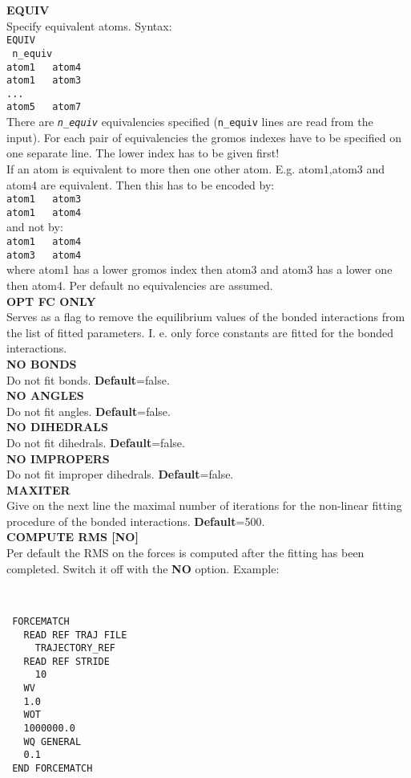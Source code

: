 \documentclass[twoside,10pt,titlepage,a4paper]{article}
\newcommand{\desc}[1]{%
   \hspace*{\fill} \parbox{130mm}{\sloppy
                          {#1}%
                             }
     \hfill\\\smallskip
   }%
\newcommand{\desc}[1]{#1\vspace{1ex}}
\begin{document}
\desc{
\textbf{EQUIV} \\
Specify equivalent atoms. Syntax: \\

\texttt{EQUIV} \\
\texttt{  n\_equiv \\
atom1 \ \ atom4 \\
atom1 \ \  atom3 \\
... \\
atom5 \ \ atom7} \\

There are \texttt{\textit{n\_equiv}} equivalencies specified (\texttt{n\_equiv} lines are read from the input). For each pair of equivalencies the gromos indexes have to be specified on one separate line. The lower index has to be given first!\\
If an atom is equivalent to more then one other atom. E.g. atom1,atom3 and atom4 are equivalent. Then this has to be encoded by: \\

\texttt{atom1 \ \ atom3 \\
atom1 \ \  atom4} \\

and not by: \\

\texttt{atom1 \ \ atom4 \\
atom3 \ \ atom4 }  \\

where atom1 has a lower gromos index then atom3 and atom3 has a lower one then atom4. Per default no equivalencies are assumed. \\
\textbf{OPT FC ONLY}\\
Serves as a flag to remove the equilibrium values of the bonded interactions from the list of fitted parameters. I. e. only force constants are fitted for the bonded interactions.\\
\textbf{NO BONDS} \\
Do not fit bonds. \textbf{Default}=false. \\
\textbf{NO ANGLES} \\
Do not fit angles. \textbf{Default}=false. \\
\textbf{NO DIHEDRALS} \\
Do not fit dihedrals. \textbf{Default}=false. \\
\textbf{NO IMPROPERS} \\
Do not fit improper dihedrals. \textbf{Default}=false. \\
\textbf{MAXITER} \\
Give on the next line the maximal number of iterations for the non-linear fitting procedure of the bonded interactions. \textbf{Default}=500.\\
\textbf{COMPUTE RMS [NO]}\\
Per default the RMS on the forces is computed after the fitting has been completed. Switch it off with the \textbf{NO} option.  
   Example:}
\begin{verbatim}
 FORCEMATCH
   READ REF TRAJ FILE
     TRAJECTORY_REF
   READ REF STRIDE
     10
   WV
   1.0
   WOT
   1000000.0
   WQ GENERAL
   0.1    
 END FORCEMATCH
\end{verbatim}
\end{document}
